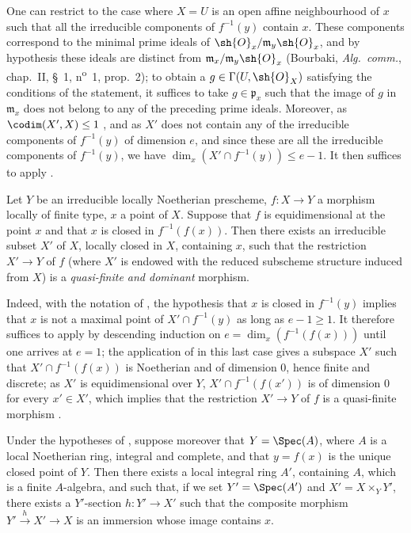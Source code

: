 One can restrict to the case where $X=U$ is an open affine neighbourhood of $x$ such that all the irreducible components of $f^{-1}(y)$ contain $x$.
These components correspond to the minimal prime ideals of $\sh{O}_x/\mathfrak{m}_y\sh{O}_x$, and by hypothesis these ideals are distinct from $\mathfrak{m}_x/\mathfrak{m}_y\sh{O}_x$ (Bourbaki, \emph{Alg.\ comm.}, chap.~II, \S~1, n\textsuperscript{o}~1, prop.~2); to obtain a $g\in\Gamma(U,\sh{O}_X)$ satisfying the conditions of the statement, it suffices to take $g\in\mathfrak{p}_x$ such that the image of $g$ in $\mathfrak{m}_x$ does not belong to any of the preceding prime ideals.
Moreover, as $\codim(X',X)\leq 1$ , and as $X'$ does not contain any of the irreducible components of $f^{-1}(y)$ of dimension $e$, and since these are all the irreducible components of $f^{-1}(y)$, we have  $\dim_x(X'\cap f^{-1}(y))\leq e-1$.
It then suffices to apply .

\begin{proposition}[14.5.3]
\label{IV.14.5.3}
Let $Y$ be an irreducible locally Noetherian prescheme, $f:X\to Y$ a morphism locally of finite type, $x$ a point of $X$.
Suppose that $f$ is equidimensional at the point $x$ and that $x$ is closed in $f^{-1}(f(x))$.
Then there exists an irreducible subset $X'$ of $X$, locally closed in $X$, containing $x$, such that the restriction $X'\to Y$ of $f$ (where $X'$ is endowed with the reduced subscheme structure induced from $X$) is a \emph{quasi-finite and dominant} morphism.
\end{proposition}

Indeed, with the notation of , the hypothesis that $x$ is closed in $f^{-1}(y)$ implies that $x$ is not a maximal point of $X'\cap f^{-1}(y)$ as long as $e-1\geq 1$.
It therefore suffices to apply  by descending induction on $e=\dim_x(f^{-1}(f(x)))$ until one arrives at $e=1$; the application of  in this last case gives a subspace $X'$ such that $X'\cap f^{-1}(f(x))$ is Noetherian and of dimension $0$, hence finite and discrete; as $X'$ is equidimensional over $Y$, $X'\cap f^{-1}(f(x'))$ is of dimension $0$ for every $x'\in X'$, which implies that the restriction $X'\to Y$ of $f$ is a quasi-finite morphism .

\begin{corollary}[14.5.4]
\label{IV.14.5.4}
Under the hypotheses of , suppose moreover that $Y=\Spec(A)$, where $A$ is a local Noetherian ring, integral and complete, and that $y=f(x)$ is the unique closed point of $Y$.
Then there exists a local integral ring $A'$, containing $A$, which is a finite $A$-algebra, and such that, if we set $Y'=\Spec(A')$ and $X'=X\times_Y Y'$, there exists a $Y'$-section $h:Y'\to X'$ such that the composite morphism $Y'\xrightarrow{h}X'\to X$ is an immersion whose image contains $x$.
\end{corollary}

